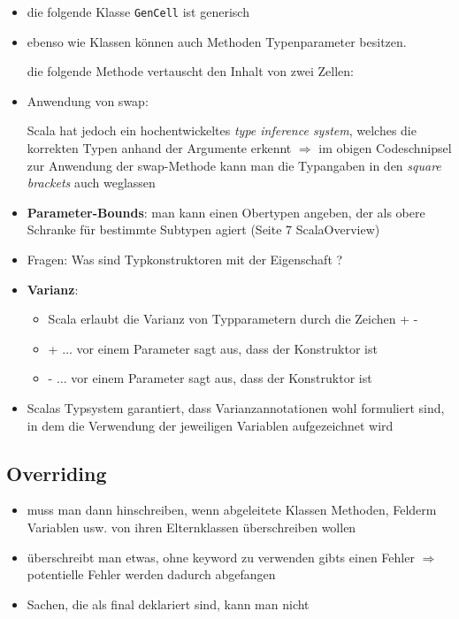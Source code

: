 \begin{itemize}
  \item die folgende Klasse \texttt{GenCell} ist generisch
  
  
  
  \item ebenso wie Klassen können auch Methoden Typenparameter besitzen.
  
  die folgende Methode vertauscht den Inhalt von zwei Zellen:
  
  
  
  \item Anwendung von swap:
  
  
  
  Scala hat jedoch ein hochentwickeltes \textit{type inference system}, welches
  die korrekten Typen anhand der Argumente erkennt $\Rightarrow$ im obigen 
  Codeschnipsel zur Anwendung der swap-Methode kann man die Typangaben in den
  \textit{square brackets} auch weglassen
  \item \textbf{Parameter-Bounds}: man kann einen Obertypen angeben, der als
  obere Schranke für bestimmte Subtypen agiert (Seite 7 ScalaOverview)
  \item Fragen: Was sind Typkonstruktoren mit der Eigenschaft ?
  \item \textbf{Varianz}: 
  \begin{itemize}
    \item Scala erlaubt die Varianz von Typparametern durch die Zeichen + \und 
    -
    \item + $\ldots$ vor einem Parameter sagt aus, dass der Konstruktor
     ist
    \item - $\ldots$ vor einem Parameter sagt aus, dass der Konstruktor
     ist
  \end{itemize}
  \item Scalas Typsystem garantiert, dass Varianzannotationen wohl formuliert
  sind, in dem die Verwendung der jeweiligen Variablen aufgezeichnet wird
\end{itemize}


\subsection{Overriding}
\begin{itemize}
  \item muss man dann hinschreiben, wenn abgeleitete Klassen Methoden, Felderm
  Variablen usw. von ihren Elternklassen überschreiben wollen
  \item überschreibt man etwas, ohne keyword  zu verwenden
  gibts einen Fehler $\Rightarrow$ potentielle Fehler werden dadurch
  abgefangen
  \item Sachen, die als final deklariert sind, kann man nicht 
\end{itemize}


